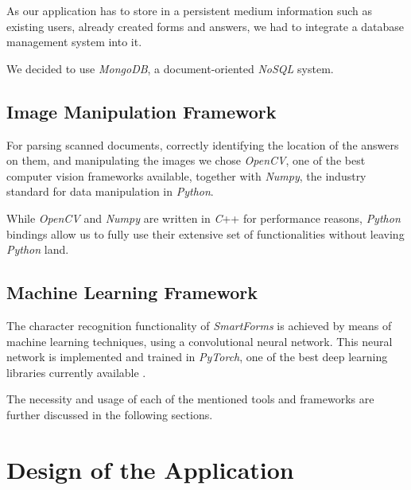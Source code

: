 \documentclass[11pt, a4paper]{report}
\begin{document}
As our application has to store in a persistent medium information such as existing users, already created forms and answers, we had to integrate a database management system into it.

We decided to use \textit{MongoDB}, a document-oriented \textit{NoSQL} system.

\section{Image Manipulation Framework}

For parsing scanned documents, correctly identifying the location of the answers on them, and manipulating the images we chose \textit{OpenCV}, one of the best computer vision frameworks available, together with \textit{Numpy}, the industry standard for data manipulation in \textit{Python}.

While \textit{OpenCV} and \textit{Numpy} are written in \textit{C}++ for performance reasons, \textit{Python} bindings allow us to fully use their extensive set of functionalities without leaving \textit{Python} land.

\section{Machine Learning Framework}

The character recognition functionality of \textit{SmartForms} is achieved by means of machine learning techniques, using a convolutional neural network.
This neural network is implemented and trained in \textit{PyTorch}, one of the best deep learning libraries currently available \cite{pytorch}.

\vspace{1em}

The necessity and usage of each of the mentioned tools and frameworks are further discussed in the following sections.


\chapter{Design of the Application}
\label{chapter-design-of-the-application}

\end{document}
